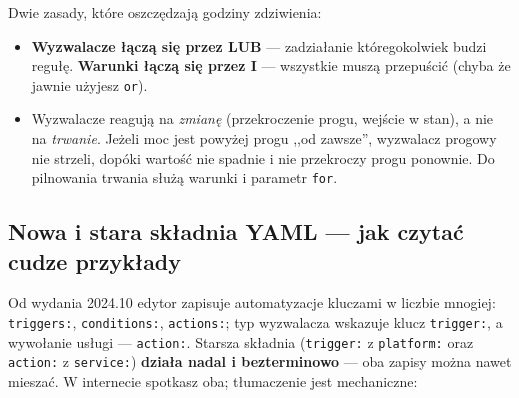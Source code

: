 \documentclass[11pt,a4paper]{article}
\begin{document}
\begin{center}
\end{center}

Dwie zasady, które oszczędzają godziny zdziwienia:
\begin{itemize}
\item \textbf{Wyzwalacze łączą się przez LUB} --- zadziałanie któregokolwiek budzi regułę. \textbf{Warunki łączą się przez I} --- wszystkie muszą przepuścić (chyba że jawnie użyjesz \texttt{or}).
\item Wyzwalacze reagują na \emph{zmianę} (przekroczenie progu, wejście w stan), a nie na \emph{trwanie}. Jeżeli moc jest powyżej progu ,,od zawsze'', wyzwalacz progowy nie strzeli, dopóki wartość nie spadnie i nie przekroczy progu ponownie. Do pilnowania trwania służą warunki i parametr \texttt{for}.
\end{itemize}

\subsection{Nowa i stara składnia YAML --- jak czytać cudze przykłady}

Od wydania 2024.10 edytor zapisuje automatyzacje kluczami w liczbie mnogiej: \texttt{triggers:}, \texttt{conditions:}, \texttt{actions:}; typ wyzwalacza wskazuje klucz \texttt{trigger:}, a wywołanie usługi --- \texttt{action:}. Starsza składnia (\texttt{trigger:} z \texttt{platform:} oraz \texttt{action:} z \texttt{service:}) \textbf{działa nadal i bezterminowo} --- oba zapisy można nawet mieszać. W internecie spotkasz oba; tłumaczenie jest mechaniczne:
\end{document}
